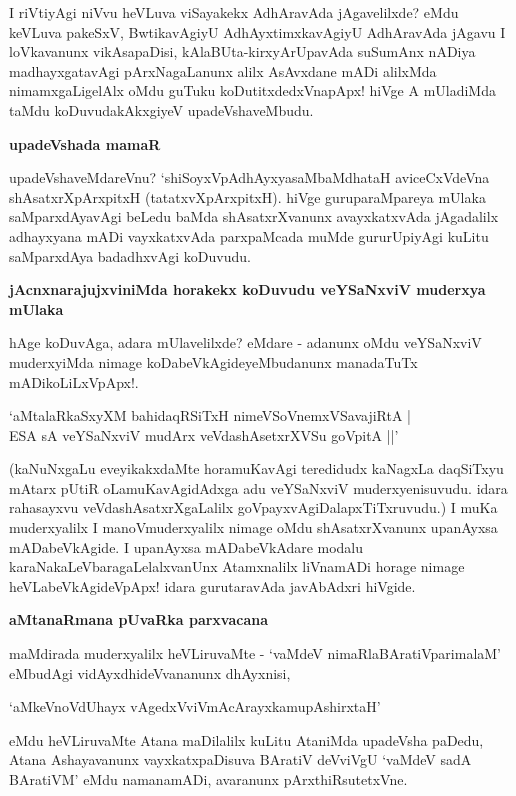 I riVtiyAgi niVvu heVLuva viSayakekx AdhAravAda jAgavelilxde? eMdu keVLuva pakeSxV, BwtikavAgiyU AdhAyxtimxkavAgiyU AdhAravAda jAgavu I loVkavanunx vikAsapaDisi, kAlaBUta-kirxyArUpavAda suSumAnx nADiya madhayxgatavAgi pArxNagaLanunx alilx AsAvxdane mADi alilxMda nimamxgaLigelAlx oMdu guTuku koDutitxdedxVnapApx! hiVge A mUladiMda taMdu koDuvudakAkxgiyeV upadeVshaveMbudu.

\noindent
\textbf{upadeVshada mamaR}\label{page83}

upadeVshaveMdareVnu? `shiSoyxVpAdhAyxyasaMbaMdhataH\label{83} aviceCxVdeVna shAsatxrXpArxpitxH (tatatxvXpArxpitxH). hiVge guruparaMpareya mUlaka saMparxdAyavAgi beLedu baMda shAsatxrXvanunx avayxkatxvAda jAgadalilx adhayxyana mADi vayxkatxvAda parxpaMcada muMde gururUpiyAgi kuLitu saMparxdAya badadhxvAgi koDuvudu.

\noindent
\textbf{jAcnxnarajujxviniMda horakekx koDuvudu veYSaNxviV muderxya mUlaka}\label{page83}

hAge koDuvAga, adara mUlavelilxde? eMdare - adanunx oMdu veYSaNxviV muderxyiMda nimage koDabeVkAgideyeMbudanunx manadaTuTx mADikoLiLxVpApx!.

\begin{shloka}
`aMtalaRkaSxyXM bahidaqRSiTxH nimeVSoVnemxVSavajiRtA |\\\label{83}
ESA sA veYSaNxviV mudArx veVdashAsetxrXVSu goVpitA ||'
\end{shloka}

(kaNuNxgaLu eveyikakxdaMte horamuKavAgi teredidudx kaNagxLa daqSiTxyu mAtarx pUtiR oLamuKavAgidAdxga adu veYSaNxviV muderxyenisuvudu. idara rahasayxvu veVdashAsatxrXgaLalilx goVpayxvAgiDalapxTiTxruvudu.) I muKa muderxyalilx I manoVmuderxyalilx nimage oMdu shAsatxrXvanunx upanAyxsa mADabeVkAgide. I upanAyxsa mADabeVkAdare modalu karaNakaLeVbaragaLelalxvanUnx Atamxnalilx liVnamADi horage nimage heVLabeVkAgideVpApx! idara gurutaravAda javAbAdxri hiVgide.

\noindent
\textbf{aMtanaRmana pUvaRka parxvacana}\label{page83}

maMdirada muderxyalilx heVLiruvaMte - `vaMdeV nimaRlaBAratiVparimalaM' eMbudAgi vidAyxdhideVvananunx dhAyxnisi,

\begin{shloka}
`aMkeVnoVdUhayx vAgedxVviVmAcArayxkamupAshirxtaH'
\end{shloka}

eMdu heVLiruvaMte Atana maDilalilx kuLitu AtaniMda upadeVsha paDedu, Atana Ashayavanunx vayxkatxpaDisuva BAratiV deVviVgU `vaMdeV sadA BAratiVM' eMdu namanamADi, avaranunx pArxthiRsutetxVne.

